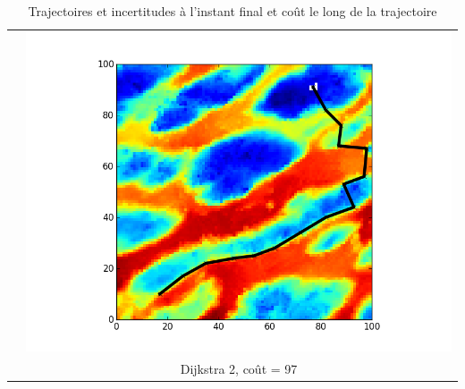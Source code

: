 \begin{table}
\begin{tabular}{cc}
&\includegraphics[scale=0.42]{../data/gradient_dijkstra/plot_A_10_17_B_91_77_iteration_015.png} \\
&Dijkstra 2, coût = 97\\
\end{tabular}
\caption{Trajectoires et incertitudes à l'instant final et coût le long de la trajectoire}
\label{tab_morne}
\end{table}

